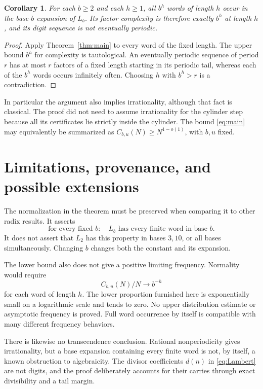 \documentclass[11pt,a4paper]{article}
\newtheorem{corollary}[theorem]{Corollary}
\theoremstyle{definition}\newtheorem{definition}[theorem]{Definition}
\theoremstyle{remark}\newtheorem{remark}[theorem]{Remark}
\begin{document}
\begin{corollary}
For each $b\ge2$ and each $h\ge1$, all $b^h$ words of length $h$ occur in the base-$b$ expansion of $L_b$. Its factor complexity is therefore exactly $b^h$ at length $h$, and its digit sequence is not eventually periodic.
\end{corollary}
\begin{proof}
Apply Theorem~\ref{thm:main} to every word of the fixed length. The upper bound $b^h$ for complexity is tautological. An eventually periodic sequence of period $r$ has at most $r$ factors of a fixed length starting in its periodic tail, whereas each of the $b^h$ words occurs infinitely often. Choosing $h$ with $b^h>r$ is a contradiction.
\end{proof}

In particular the argument also implies irrationality, although that fact is classical. The proof did not need to assume irrationality for the cylinder step because all its certificates lie strictly inside the cylinder. The bound \eqref{eq:main} may equivalently be summarized as $C_{b,u}(N)\ge N^{1-o(1)}$, with $b,u$ fixed.

\section{Limitations, provenance, and possible extensions}
The normalization in the theorem must be preserved when comparing it to other radix results. It asserts
\[
 \text{for every fixed }b:\quad L_b\text{ has every finite word in base }b.
\]
It does not assert that $L_2$ has this property in bases $3,10$, or all bases simultaneously. Changing $b$ changes both the constant and its expansion.

The lower bound also does not give a positive limiting frequency. Normality would require
\[
 C_{b,u}(N)/N\longrightarrow b^{-h}
\]
for each word of length $h$. The lower proportion furnished here is exponentially small on a logarithmic scale and tends to zero. No upper distribution estimate or asymptotic frequency is proved. Full word occurrence by itself is compatible with many different frequency behaviors.

There is likewise no transcendence conclusion. Rational nonperiodicity gives irrationality, but a base expansion containing every finite word is not, by itself, a known obstruction to algebraicity. The divisor coefficients $d(n)$ in \eqref{eq:Lambert} are not digits, and the proof deliberately accounts for their carries through exact divisibility and a tail margin.
\end{document}

